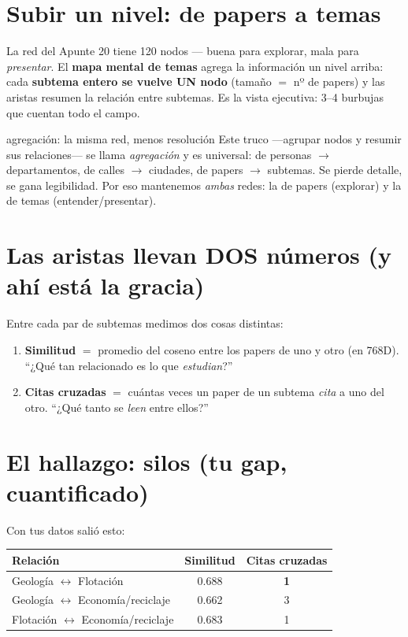 \documentclass[11pt,a4paper]{article}
\begin{document}
\section{Subir un nivel: de papers a temas}

La red del Apunte 20 tiene 120 nodos — buena para explorar, mala para \emph{presentar}.
El \textbf{mapa mental de temas} agrega la información un nivel arriba: cada
\textbf{subtema entero se vuelve UN nodo} (tamaño $=$ nº de papers) y las aristas resumen
la relación entre subtemas. Es la vista ejecutiva: 3--4 burbujas que cuentan todo el campo.

\begin{concepto}{agregación: la misma red, menos resolución}
Este truco —agrupar nodos y resumir sus relaciones— se llama \emph{agregación} y es
universal: de personas $\rightarrow$ departamentos, de calles $\rightarrow$ ciudades, de
papers $\rightarrow$ subtemas. Se pierde detalle, se gana legibilidad. Por eso mantenemos
\emph{ambas} redes: la de papers (explorar) y la de temas (entender/presentar).
\end{concepto}

\section{Las aristas llevan DOS números (y ahí está la gracia)}

Entre cada par de subtemas medimos dos cosas distintas:
\begin{enumerate}
  \item \textbf{Similitud} $=$ promedio del coseno entre los papers de uno y otro (en 768D).
        ``¿Qué tan relacionado es lo que \emph{estudian}?''
  \item \textbf{Citas cruzadas} $=$ cuántas veces un paper de un subtema \emph{cita} a uno
        del otro. ``¿Qué tanto se \emph{leen} entre ellos?''
\end{enumerate}

\section{El hallazgo: silos (tu gap, cuantificado)}

Con tus datos salió esto:

\begin{center}
\begin{tabular}{lcc}
\textbf{Relación} & \textbf{Similitud} & \textbf{Citas cruzadas} \\
\hline
Geología $\leftrightarrow$ Flotación & 0.688 & \textbf{1} \\
Geología $\leftrightarrow$ Economía/reciclaje & 0.662 & 3 \\
Flotación $\leftrightarrow$ Economía/reciclaje & 0.683 & 1 \\
\end{tabular}
\end{center}
\end{document}

